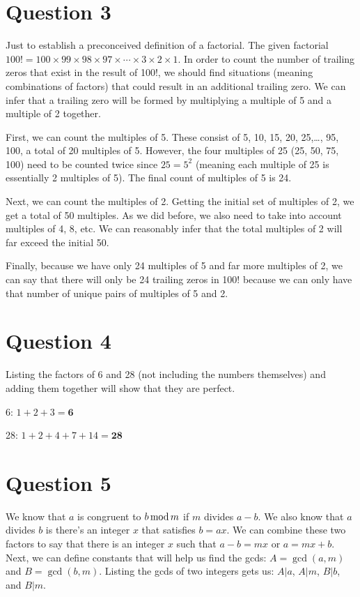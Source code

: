 \documentclass[letterpaper, 12pt]{article}
\begin{document}
\section*{Question 3}
Just to establish a preconceived definition of a factorial. The given factorial $100! = 100 \times 99 \times 98 \times 97 \times \cdots \times 3 \times 2 \times 1$. In order to count the number of trailing zeros that exist in the result of 100!, we should find situations (meaning combinations of factors) that could result in an additional trailing zero. We can infer that a trailing zero will be formed by multiplying a multiple of 5 and a multiple of 2 together.

First, we can count the multiples of 5. These consist of 5, 10, 15, 20, 25,\ldots, 95, 100, a total of 20 multiples of 5. However, the four multiples of 25 (25, 50, 75, 100) need to be counted twice since $25=5^2$ (meaning each multiple of 25 is essentially 2 multiples of 5). The final count of multiples of 5 is 24.

Next, we can count the multiples of 2. Getting the initial set of multiples of 2, we get a total of 50 multiples. As we did before, we also need to take into account multiples of 4, 8, etc. We can reasonably infer that the total multiples of 2 will far exceed the initial 50.

Finally, because we have only 24 multiples of 5 and far more multiples of 2, we can say that there will only be 24 trailing zeros in 100! because we can only have that number of unique pairs of multiples of 5 and 2.

\section*{Question 4}
Listing the factors of 6 and 28 (not including the numbers themselves) and adding them together will show that they are perfect.

6: $1+2+3=\textbf{6}$

28: $1+2+4+7+14=\textbf{28}$

\section*{Question 5}
We know that $a$ is congruent to $b \mathinner{\text{mod}} m$ if $m$ divides $a-b$. We also know that $a$ divides $b$ is there's an integer $x$ that satisfies $b = ax$. We can combine these two factors to say that there is an integer $x$ such that $a - b = mx$ or $a = mx + b$. Next, we can define constants that will help us find the gcds: $A = \gcd(a, m)$ and $B = \gcd(b,m)$. Listing the gcds of two integers gets us: $A|a$, $A|m$, $B|b$, and $B|m$.
\end{document}
